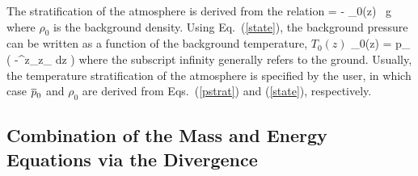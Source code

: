 \documentclass[11pt]{book}
\begin{document}
The stratification of the atmosphere is derived from the relation
\be {} = - \rho_0(z) \, g  \ee
where $\rho_0$ is the background
density. Using Eq.~(\ref{state}), the background pressure can be written as a function of the background temperature, $T_0(z)$
\be \bp_0(z) = p_\infty \; \exp \; \left( -\int^z_{z_\infty}  dz \right)  \label{pstrat} \ee
where the subscript infinity generally refers to the ground. Usually, the temperature stratification of the atmosphere is
specified by the user, in which case $\overline{p}_0$ and $\rho_0$ are derived from Eqs.~(\ref{pstrat}) and (\ref{state}), respectively.


\subsection{Combination of the Mass and Energy Equations via the Divergence}
\end{document}
